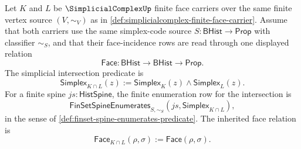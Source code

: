 \begin{definition}
\label{def:simplicialcomplex-intersection-carrier-rows}
Let $K$ and $L$ be $\SimplicialComplexUp$ finite face carriers over the same finite vertex source $(V,\sim_V)$ as in \autoref{def:simplicialcomplex-finite-face-carrier}. Assume that both carriers use the same simplex-code source $S:\mathsf{BHist}\to\mathsf{Prop}$ with classifier $\sim_S$, and that their face-incidence rows are read through one displayed relation
$$
\mathsf{Face}:\mathsf{BHist}\to\mathsf{BHist}\to\mathsf{Prop}.
$$
The simplicial intersection predicate is
$$
\mathsf{Simplex}_{K\cap L}(z):=
\mathsf{Simplex}_K(z)\land\mathsf{Simplex}_L(z).
$$
For a finite spine $js:\mathsf{HistSpine}$, the finite enumeration row for the intersection is
$$
\mathsf{FinSetSpineEnumerates}_{S,\sim_S}(js,\mathsf{Simplex}_{K\cap L}),
$$
in the sense of \autoref{def:finset-spine-enumerates-predicate}. The inherited face relation is
$$
\mathsf{Face}_{K\cap L}(\rho,\sigma):=\mathsf{Face}(\rho,\sigma).
$$
\end{definition}

